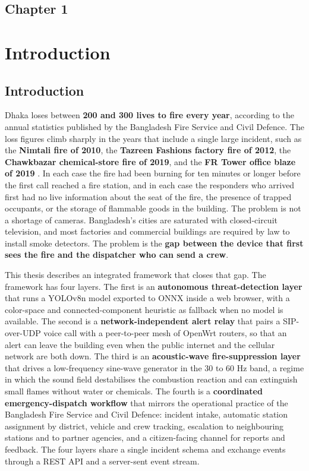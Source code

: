\begin{center}
    \section*{\fontsize{20}{20}\selectfont Chapter 1}
\end{center}
\vspace{10mm}
\section{Introduction}
\subsection{Introduction}

Dhaka loses between \textbf{200 and 300 lives to fire every year}, according to the annual statistics published by the Bangladesh Fire Service and Civil Defence. The loss figures climb sharply in the years that include a single large incident, such as the \textbf{Nimtali fire of 2010}, the \textbf{Tazreen Fashions factory fire of 2012}, the \textbf{Chawkbazar chemical-store fire of 2019}, and the \textbf{FR Tower office blaze of 2019} \cite{fscdAnnual2024}. In each case the fire had been burning for ten minutes or longer before the first call reached a fire station, and in each case the responders who arrived first had no live information about the seat of the fire, the presence of trapped occupants, or the storage of flammable goods in the building. The problem is not a shortage of cameras. Bangladesh's cities are saturated with closed-circuit television, and most factories and commercial buildings are required by law to install smoke detectors. The problem is the \textbf{gap between the device that first sees the fire and the dispatcher who can send a crew}.

This thesis describes an integrated framework that closes that gap. The framework has four layers. The first is an \textbf{autonomous threat-detection layer} that runs a YOLOv8n model exported to ONNX inside a web browser, with a color-space and connected-component heuristic as fallback when no model is available. The second is a \textbf{network-independent alert relay} that pairs a SIP-over-UDP voice call with a peer-to-peer mesh of OpenWrt routers, so that an alert can leave the building even when the public internet and the cellular network are both down. The third is an \textbf{acoustic-wave fire-suppression layer} that drives a low-frequency sine-wave generator in the 30 to 60 Hz band, a regime in which the sound field destabilises the combustion reaction and can extinguish small flames without water or chemicals. The fourth is a \textbf{coordinated emergency-dispatch workflow} that mirrors the operational practice of the Bangladesh Fire Service and Civil Defence: incident intake, automatic station assignment by district, vehicle and crew tracking, escalation to neighbouring stations and to partner agencies, and a citizen-facing channel for reports and feedback. The four layers share a single incident schema and exchange events through a REST API and a server-sent event stream.

